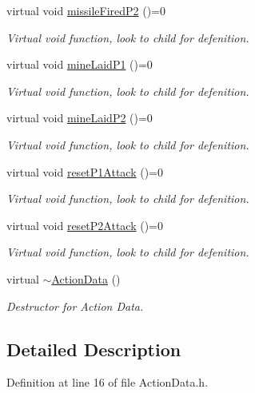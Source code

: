 \begin{DoxyCompactItemize}
virtual void \hyperlink{classActionData_a5a2d45d0fc03daf8edaacd6a9757fafd}{missile\-Fired\-P2} ()=0
\begin{DoxyCompactList}\small\item\em Virtual void function, look to child for defenition. \end{DoxyCompactList}\item 
virtual void \hyperlink{classActionData_a8abc4e84c4e6d676010c7e2497278312}{mine\-Laid\-P1} ()=0
\begin{DoxyCompactList}\small\item\em Virtual void function, look to child for defenition. \end{DoxyCompactList}\item 
virtual void \hyperlink{classActionData_a71c04f577d3c06aa45b7c43d935ca567}{mine\-Laid\-P2} ()=0
\begin{DoxyCompactList}\small\item\em Virtual void function, look to child for defenition. \end{DoxyCompactList}\item 
virtual void \hyperlink{classActionData_a12925d051a1cd40bddcb18f0be2c2b01}{reset\-P1\-Attack} ()=0
\begin{DoxyCompactList}\small\item\em Virtual void function, look to child for defenition. \end{DoxyCompactList}\item 
virtual void \hyperlink{classActionData_ab8a96447019bfc7a275903dfa42cfcf5}{reset\-P2\-Attack} ()=0
\begin{DoxyCompactList}\small\item\em Virtual void function, look to child for defenition. \end{DoxyCompactList}\item 
virtual \hyperlink{classActionData_ad26f0ce70e0e397572dce0c87af1665a}{$\sim$\-Action\-Data} ()
\begin{DoxyCompactList}\small\item\em Destructor for Action Data. \end{DoxyCompactList}\end{DoxyCompactItemize}


\subsection{Detailed Description}


Definition at line 16 of file Action\-Data.\-h.



